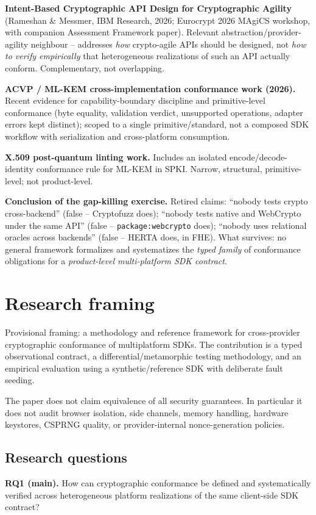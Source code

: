 \documentclass[11pt,a4paper]{article}
\begin{document}
\textbf{Intent-Based Cryptographic API Design for Cryptographic Agility} (Rameshan \& Messmer, IBM Research, 2026; Eurocrypt 2026 MAgiCS workshop, with companion Assessment Framework paper). Relevant abstraction/provider-agility neighbour -- addresses \emph{how} crypto-agile APIs should be designed, not \emph{how to verify empirically} that heterogeneous realizations of such an API actually conform. Complementary, not overlapping.

\textbf{ACVP / ML-KEM cross-implementation conformance work (2026).} Recent evidence for capability-boundary discipline and primitive-level conformance (byte equality, validation verdict, unsupported operations, adapter errors kept distinct); scoped to a single primitive/standard, not a composed SDK workflow with serialization and cross-platform consumption.

\textbf{X.509 post-quantum linting work.} Includes an isolated encode/decode-identity conformance rule for ML-KEM in SPKI. Narrow, structural, primitive-level; not product-level.

\textbf{Conclusion of the gap-killing exercise.} Retired claims: ``nobody tests crypto cross-backend'' (false -- Cryptofuzz does); ``nobody tests native and WebCrypto under the same API'' (false -- \texttt{package:webcrypto} does); ``nobody uses relational oracles across backends'' (false -- HERTA does, in FHE). What survives: no general framework formalizes and systematizes the \emph{typed family} of conformance obligations for a \emph{product-level multi-platform SDK contract}.

\section{Research framing}
Provisional framing: a methodology and reference framework for cross-provider cryptographic conformance of multiplatform SDKs. The contribution is a typed observational contract, a differential/metamorphic testing methodology, and an empirical evaluation using a synthetic/reference SDK with deliberate fault seeding.

The paper does not claim equivalence of all security guarantees. In particular it does not audit browser isolation, side channels, memory handling, hardware keystores, CSPRNG quality, or provider-internal nonce-generation policies.

\subsection{Research questions}
\textbf{RQ1 (main).} How can cryptographic conformance be defined and systematically verified across heterogeneous platform realizations of the same client-side SDK contract?
\end{document}
